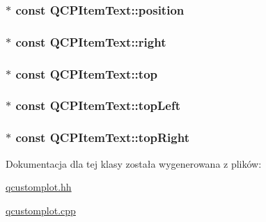 \subsubsection[{\texorpdfstring{position}{position}}]{$\ast$ const Q\+C\+P\+Item\+Text\+::position}\hypertarget{class_q_c_p_item_text_a0d228a00e819022b5690c65762721129}{}\label{class_q_c_p_item_text_a0d228a00e819022b5690c65762721129}
\subsubsection[{\texorpdfstring{right}{right}}]{$\ast$ const Q\+C\+P\+Item\+Text\+::right}\hypertarget{class_q_c_p_item_text_aef159622ce6502412e782a21ba6d84f2}{}\label{class_q_c_p_item_text_aef159622ce6502412e782a21ba6d84f2}
\subsubsection[{\texorpdfstring{top}{top}}]{$\ast$ const Q\+C\+P\+Item\+Text\+::top}\hypertarget{class_q_c_p_item_text_a5c87ee162cbbe3d166b97826c8849304}{}\label{class_q_c_p_item_text_a5c87ee162cbbe3d166b97826c8849304}
\subsubsection[{\texorpdfstring{top\+Left}{topLeft}}]{$\ast$ const Q\+C\+P\+Item\+Text\+::top\+Left}\hypertarget{class_q_c_p_item_text_a6354d8762182a3502103fabe5fbb8512}{}\label{class_q_c_p_item_text_a6354d8762182a3502103fabe5fbb8512}
\subsubsection[{\texorpdfstring{top\+Right}{topRight}}]{$\ast$ const Q\+C\+P\+Item\+Text\+::top\+Right}\hypertarget{class_q_c_p_item_text_ad18ac45cb4cc135de1eb78f2e86b6504}{}\label{class_q_c_p_item_text_ad18ac45cb4cc135de1eb78f2e86b6504}


Dokumentacja dla tej klasy została wygenerowana z plików\+:\begin{DoxyCompactItemize}
\item 
\hyperlink{qcustomplot_8hh}{qcustomplot.\+hh}\item 
\hyperlink{qcustomplot_8cpp}{qcustomplot.\+cpp}\end{DoxyCompactItemize}
